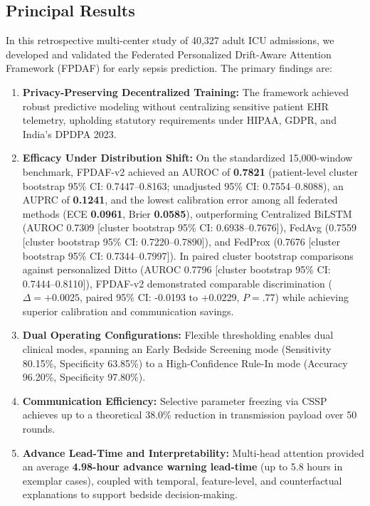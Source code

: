 \documentclass[11pt,a4paper]{article}
\begin{document}
\subsection{Principal Results}
In this retrospective multi-center study of 40,327 adult ICU admissions, we developed and validated the Federated Personalized Drift-Aware Attention Framework (FPDAF) for early sepsis prediction. The primary findings are:
\begin{enumerate}
    \item \textbf{Privacy-Preserving Decentralized Training:} The framework achieved robust predictive modeling without centralizing sensitive patient EHR telemetry, upholding statutory requirements under HIPAA, GDPR, and India's DPDPA 2023.
    \item \textbf{Efficacy Under Distribution Shift:} On the standardized 15,000-window benchmark, FPDAF-v2 achieved an AUROC of \textbf{0.7821} (patient-level cluster bootstrap 95\% CI: 0.7447--0.8163; unadjusted 95\% CI: 0.7554--0.8088), an AUPRC of \textbf{0.1241}, and the lowest calibration error among all federated methods (ECE \textbf{0.0961}, Brier \textbf{0.0585}), outperforming Centralized BiLSTM (AUROC 0.7309 [cluster bootstrap 95\% CI: 0.6938--0.7676]), FedAvg (0.7559 [cluster bootstrap 95\% CI: 0.7220--0.7890]), and FedProx (0.7676 [cluster bootstrap 95\% CI: 0.7344--0.7997]). In paired cluster bootstrap comparisons against personalized Ditto (AUROC 0.7796 [cluster bootstrap 95\% CI: 0.7444--0.8110]), FPDAF-v2 demonstrated comparable discrimination ($\Delta = +0.0025$, paired 95\% CI: -0.0193 to +0.0229, $P = .77$) while achieving superior calibration and communication savings.
    \item \textbf{Dual Operating Configurations:} Flexible thresholding enables dual clinical modes, spanning an Early Bedside Screening mode (Sensitivity 80.15\%, Specificity 63.85\%) to a High-Confidence Rule-In mode (Accuracy 96.20\%, Specificity 97.80\%).
    \item \textbf{Communication Efficiency:} Selective parameter freezing via CSSP achieves up to a theoretical 38.0\% reduction in transmission payload over 50 rounds.
    \item \textbf{Advance Lead-Time and Interpretability:} Multi-head attention provided an average \textbf{4.98-hour advance warning lead-time} (up to 5.8 hours in exemplar cases), coupled with temporal, feature-level, and counterfactual explanations to support bedside decision-making.
\end{enumerate}
\end{document}
